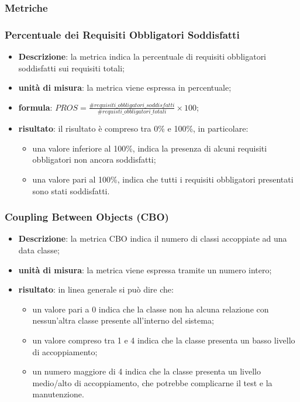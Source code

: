 \subsubsection{Metriche}
	\subsubsection*{Percentuale dei Requisiti Obbligatori Soddisfatti}
		\begin{itemize}
			\item{\textbf{Descrizione}}: la metrica indica la percentuale di requisiti obbligatori soddisfatti sui requisiti totali;
			\item{\textbf{unità di misura}}: la metrica viene espressa in percentuale;
			\item{\textbf{formula}}: $ PROS = \displaystyle\frac{\#requisiti\_obbligatori\_soddisfatti}{\#requisti\_obbligatori\_totali}\times100$;
			\item{\textbf{risultato}}: il risultato è compreso tra 0\% e 100\%, in particolare:
				\begin{itemize}
					\item una valore inferiore al 100\%, indica la presenza di alcuni requisiti obbligatori non ancora soddisfatti;
					\item una valore pari al 100\%, indica che tutti i requisiti obbligatori presentati sono stati soddisfatti.
				\end{itemize}
		\end{itemize}

		\subsubsection*{Coupling Between Objects (CBO)}
		\begin{itemize}
			\item{\textbf{Descrizione}}: la metrica CBO indica il numero di classi accoppiate ad una data classe;
			\item{\textbf{unità di misura}}: la metrica viene espressa tramite un numero intero;
			\item{\textbf{risultato}}: in linea generale si può dire che:
			\begin{itemize}
				\item un valore pari a 0 indica che la classe non ha alcuna relazione con nessun'altra classe presente all'interno del sistema;
				\item un valore compreso tra 1 e 4 indica che la classe presenta un basso livello di accoppiamento;
				\item un numero maggiore di 4 indica che la classe presenta un livello medio/alto di accoppiamento, che potrebbe complicarne il test e la manutenzione.
			\end{itemize}
		\end{itemize}

